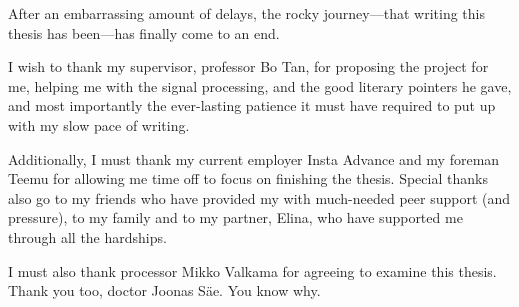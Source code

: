 After an embarrassing amount of delays,
the rocky journey---that writing this thesis has been---has finally come to an end.

I wish to thank my supervisor, professor Bo Tan,
for proposing the project for me,
helping me with the signal processing,
and the good literary pointers he gave,
and most importantly the ever-lasting patience it must have required to put up with my slow pace of writing.

Additionally, I must thank my current employer Insta Advance and my foreman Teemu for allowing me time off to focus on finishing the thesis.
Special thanks also go to my friends who have provided my with much-needed peer support (and pressure),
to my family and to my partner, Elina, who have supported me through all the hardships.

I must also thank processor Mikko Valkama for agreeing to examine this thesis.
Thank you too, doctor Joonas Säe. You know why.